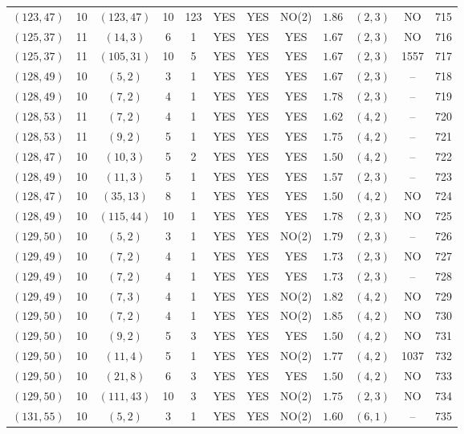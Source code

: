 \begin{longtable}{|c|c|c|c|c|c|c|c|c|c|c|c|}
$(123,47)$ & 10 & $(123,47)$ & 10 & 123 & YES & YES & NO(2) & $1.86$ & $(2,3)$ & NO & 715\\
$(125,37)$ & 11 & $(14,3)$ & 6 & 1 & YES & YES & YES & $1.67$ & $(2,3)$ & NO & 716\\
$(125,37)$ & 11 & $(105,31)$ & 10 & 5 & YES & YES & YES & $1.67$ & $(2,3)$ & 1557 & 717\\
$(128,49)$ & 10 & $(5,2)$ & 3 & 1 & YES & YES & YES & $1.67$ & $(2,3)$ & -- & 718\\
$(128,49)$ & 10 & $(7,2)$ & 4 & 1 & YES & YES & YES & $1.78$ & $(2,3)$ & -- & 719\\
$(128,53)$ & 11 & $(7,2)$ & 4 & 1 & YES & YES & YES & $1.62$ & $(4,2)$ & -- & 720\\
$(128,53)$ & 11 & $(9,2)$ & 5 & 1 & YES & YES & YES & $1.75$ & $(4,2)$ & -- & 721\\
$(128,47)$ & 10 & $(10,3)$ & 5 & 2 & YES & YES & YES & $1.50$ & $(4,2)$ & -- & 722\\
$(128,49)$ & 10 & $(11,3)$ & 5 & 1 & YES & YES & YES & $1.57$ & $(2,3)$ & -- & 723\\
$(128,47)$ & 10 & $(35,13)$ & 8 & 1 & YES & YES & YES & $1.50$ & $(4,2)$ & NO & 724\\
$(128,49)$ & 10 & $(115,44)$ & 10 & 1 & YES & YES & YES & $1.78$ & $(2,3)$ & NO & 725\\
$(129,50)$ & 10 & $(5,2)$ & 3 & 1 & YES & YES & NO(2) & $1.79$ & $(2,3)$ & -- & 726\\
$(129,49)$ & 10 & $(7,2)$ & 4 & 1 & YES & YES & YES & $1.73$ & $(2,3)$ & NO & 727\\
$(129,49)$ & 10 & $(7,2)$ & 4 & 1 & YES & YES & YES & $1.73$ & $(2,3)$ & -- & 728\\
$(129,49)$ & 10 & $(7,3)$ & 4 & 1 & YES & YES & NO(2) & $1.82$ & $(4,2)$ & NO & 729\\
$(129,50)$ & 10 & $(7,2)$ & 4 & 1 & YES & YES & NO(2) & $1.85$ & $(4,2)$ & NO & 730\\
$(129,50)$ & 10 & $(9,2)$ & 5 & 3 & YES & YES & YES & $1.50$ & $(4,2)$ & NO & 731\\
$(129,50)$ & 10 & $(11,4)$ & 5 & 1 & YES & YES & NO(2) & $1.77$ & $(4,2)$ & 1037 & 732\\
$(129,50)$ & 10 & $(21,8)$ & 6 & 3 & YES & YES & YES & $1.50$ & $(4,2)$ & NO & 733\\
$(129,50)$ & 10 & $(111,43)$ & 10 & 3 & YES & YES & NO(2) & $1.75$ & $(2,3)$ & NO & 734\\
$(131,55)$ & 10 & $(5,2)$ & 3 & 1 & YES & YES & NO(2) & $1.60$ & $(6,1)$ & -- & 735\\

\end{longtable}
